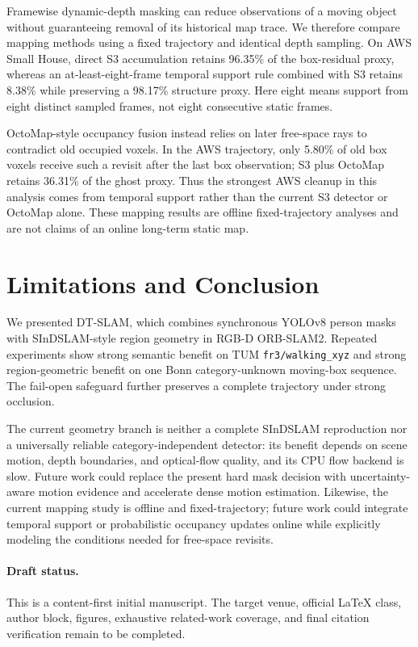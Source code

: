 \documentclass[10pt]{article}
\begin{document}
Framewise dynamic-depth masking can reduce observations of a moving object without guaranteeing removal of its historical map trace. We therefore compare mapping methods using a fixed trajectory and identical depth sampling. On AWS Small House, direct S3 accumulation retains 96.35\% of the box-residual proxy, whereas an at-least-eight-frame temporal support rule combined with S3 retains 8.38\% while preserving a 98.17\% structure proxy. Here eight means support from eight distinct sampled frames, not eight consecutive static frames.

OctoMap-style occupancy fusion \citep{octomap} instead relies on later free-space rays to contradict old occupied voxels. In the AWS trajectory, only 5.80\% of old box voxels receive such a revisit after the last box observation; S3 plus OctoMap retains 36.31\% of the ghost proxy. Thus the strongest AWS cleanup in this analysis comes from temporal support rather than the current S3 detector or OctoMap alone. These mapping results are offline fixed-trajectory analyses and are not claims of an online long-term static map.

\section{Limitations and Conclusion}

We presented DT-SLAM, which combines synchronous YOLOv8 person masks with SInDSLAM-style region geometry in RGB-D ORB-SLAM2. Repeated experiments show strong semantic benefit on TUM \texttt{fr3/walking\_xyz} and strong region-geometric benefit on one Bonn category-unknown moving-box sequence. The fail-open safeguard further preserves a complete trajectory under strong occlusion.

The current geometry branch is neither a complete SInDSLAM reproduction nor a universally reliable category-independent detector: its benefit depends on scene motion, depth boundaries, and optical-flow quality, and its CPU flow backend is slow. Future work could replace the present hard mask decision with uncertainty-aware motion evidence and accelerate dense motion estimation. Likewise, the current mapping study is offline and fixed-trajectory; future work could integrate temporal support or probabilistic occupancy updates online while explicitly modeling the conditions needed for free-space revisits.

\paragraph{Draft status.} This is a content-first initial manuscript. The target venue, official LaTeX class, author block, figures, exhaustive related-work coverage, and final citation verification remain to be completed.



\end{document}
